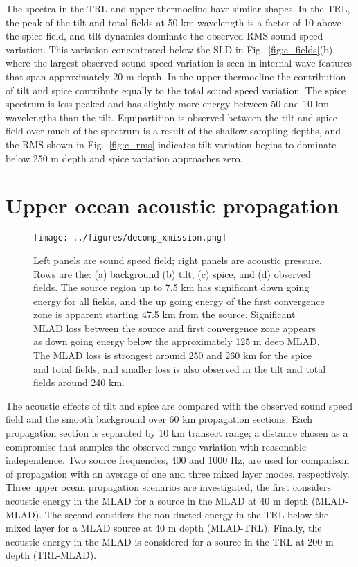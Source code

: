 \documentclass[preprint,NumberedRefs]{JASA}
\begin{document}
The spectra in the TRL and upper thermocline have similar shapes. In the TRL, the peak of the tilt and total fields at 50 km wavelength is a factor of 10 above the spice field, and tilt dynamics dominate the observed RMS sound speed variation. This variation concentrated below the SLD in Fig.~\ref{fig:c_fields}(b), where the largest observed sound speed variation is seen in internal wave features that span approximately 20 m depth. In the upper thermocline the contribution of tilt and spice contribute equally to the total sound speed variation. The spice spectrum is less peaked and has slightly more energy between 50 and 10 km wavelengths than the tilt. Equipartition is observed between the tilt and spice field over much of the spectrum is a result of the shallow sampling depths, and the RMS shown in Fig.~\ref{fig:c_rms} indicates tilt variation begins to dominate below 250 m depth and spice variation approaches zero.

\section{\label{sec:propagation}Upper ocean acoustic propagation}
\begin{figure}
\texttt{[image: ../figures/decomp\_xmission.png]}
    \caption{\label{fig:decomp_x}{Left panels are sound speed field; right panels are acoustic pressure. Rows are the: (a) background (b) tilt, (c) spice, and (d) observed fields. The source region up to 7.5 km has significant down going energy for all fields, and the up going energy of the first convergence zone is apparent starting 47.5 km from the source. Significant MLAD loss between the source and first convergence zone appears as down going energy below the approximately 125 m deep MLAD. The MLAD loss is strongest around 250 and 260 km for the spice and total fields, and smaller loss is also observed in the tilt and total fields around 240 km.}}
\end{figure}

The acoustic effects of tilt and spice are compared with the observed sound speed field and the smooth background over 60 km propagation sections. Each propagation section is separated by 10 km transect range; a distance chosen as a compromise that samples the observed range variation with reasonable independence. Two source frequencies, 400 and 1000 Hz, are used for comparison of propagation with an average of one and three mixed layer modes, respectively. Three upper ocean propagation scenarios are investigated, the first considers acoustic energy in the MLAD for a source in the MLAD at 40 m depth (MLAD-MLAD). The second considers the non-ducted energy in the TRL below the mixed layer for a MLAD source at 40 m depth (MLAD-TRL). Finally, the acoustic energy in the MLAD is considered for a source in the TRL at 200 m depth (TRL-MLAD).
\end{document}

